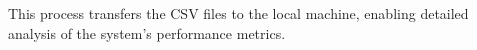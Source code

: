 This process transfers the CSV files to the local machine, enabling detailed analysis of the system’s performance metrics.













